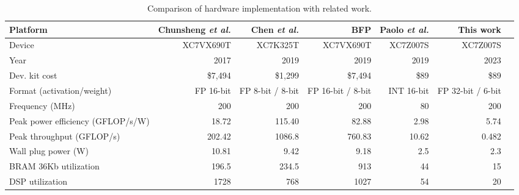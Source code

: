 \begin{table}[!t]\centering
	\caption{Comparison of hardware implementation with related work.}\label{tab:comparison}
	\scriptsize
	\begin{tabular}{lrrrrrr}\toprule
		Platform &Chunsheng \textit{et al.} \cite{mei2017200mhz} &Chen \textit{et al.} \cite{wu2021low} &BFP \cite{lian2019high} &Paolo \textit{et al.} \cite{meloni2019cnn} &This work \\\midrule
		Device &XC7VX690T &XC7K325T &XC7VX690T &XC7Z007S &XC7Z007S \\
		Year &2017 &2019 &2019 &2019 &2023 \\
		Dev. kit cost &\$7,494 &\$1,299 &\$7,494 &\$89 &\$89 \\
		Format (activation/weight) &FP 16-bit &FP 8-bit / 8-bit &FP 16-bit / 8-bit &INT 16-bit &FP 32-bit / 6-bit \\
		Frequency (MHz) &200 &200 &200 &80 &200 \\
		Peak power efficiency (GFLOP/s/W) &18.72 &115.40 &82.88 &2.98 &5.74 \\
		Peak throughput (GFLOP/s) & 202.42 & 1086.8 & 760.83 &  10.62& 0.482\\
		Wall plug power (W) &10.81 &9.42 &9.18 &2.5 &2.3 \\
		BRAM 36Kb utilization &196.5 &234.5 &913 &44 &15 \\
		DSP utilization &1728 &768 &1027 &54 &20 \\
		\bottomrule
	\end{tabular}
\end{table}